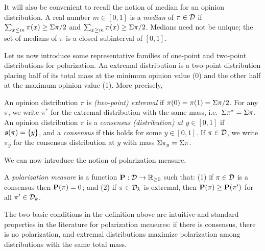 It will also be convenient to recall the notion of median for an opinion distribution. A real number $m\in[0,1]$ is a \emph{median} of $\pi\in\mathcal{D}$ if $\sum_{x\le m}\pi(x)\ge \Sigma \pi/2$ and $\sum_{x\ge m}\pi(x)\ge \Sigma \pi/2$. Medians need not be unique; the set of medians of $\pi$ is a closed subinterval of $[0,1]$.

Let us now introduce some representative families of one-point and two-point distributions for polarization. An extremal distribution is a two-point distribution placing half of its total mass at the minimum opinion value (0) and the other half at the maximum opinion value (1). More precisely, 

\begin{definition}  
An opinion distribution $\pi$ is \emph{(two-point) extremal} if $\pi(0)=\pi(1)=\Sigma \pi/2$. For any $\pi$, we write $\pi^*$ for the extremal distribution with the same mass, i.e.\ $\Sigma \pi^*=\Sigma \pi$. An opinion distribution $\pi$ is a \emph{consensus (distribution) at $y \in [0,1]$} if $\boldsymbol{s}(\pi)=\{y\}$, and a \emph{consensus} if this holds for some $y \in [0,1]$. If $\pi \in \mathcal{D}$, we write $\pi_y$ for the consensus distribution at $y$ with mass $\Sigma \pi_y= \Sigma \pi$.
\end{definition}

We can now introduce the notion of polarization measure.

\begin{definition}\label{pol:def}  
A \emph{polarization measure} is a function $\mathbf{P}:\mathcal{D} \to \mathbb{R}_{\geq 0}$ such that:  
(1) if $\pi \in \mathcal{D}$ is a consensus then $\mathbf{P}(\pi)=0$; and 
(2) if $\pi \in \mathcal{D}_k$ is extremal, then $\mathbf{P}(\pi) \geq \mathbf{P}(\pi')$ for all $\pi' \in \mathcal{D}_k$.  
\end{definition}

The two basic conditions in the definition above are intuitive and standard properties in the literature \cite{esteban1994measurement} for polarization measures: if there is consensus, there is no polarization, and extremal distributions maximize polarization among distributions with the same total mass.

